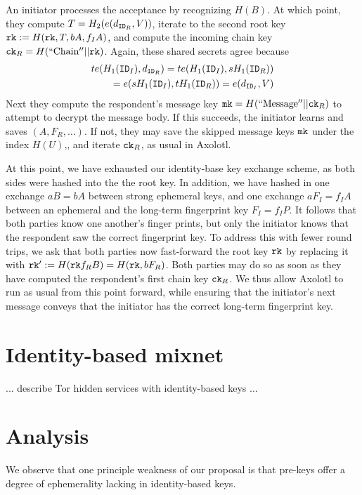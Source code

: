 \documentclass[twoside,letterpaper]{sig-alternate}
\def\mathperiod{.}
\def\mathperiod{}
\begin{document}
An initiator processes the acceptance by recognizing $H(B)$.
At which point, they compute $T = H_2( e(d_{\mathtt{ID}_R}, V) )$,
iterate to the second root key $\mathtt{rk} := H(\mathtt{rk}, T, b A, f_I A )$, and 
compute the incoming chain key $\mathtt{ck}_R = H(\mathrm{``Chain''} || \mathtt{rk})$.
Again, these shared secrets agree because 
\begin{align*}
t e(H_1(\ID_I), d_{\ID_R}) = t e(H_1(\ID_I), s H_1(\ID_R)) \\
 \quad = e(s H_1(\ID_I), t H_1(\ID_R)) = e(d_{\ID_I}, V) \mathperiod
\end{align*}
Next they compute the respondent's
 message key $\mathtt{mk} = H(\mathrm{``Message''}  || \mathtt{ck}_R)$ 
to attempt to decrypt the message body.
If this succeeds, the initiator learns and saves $(A,F_R,\ldots)$.
If not, they may save the skipped message keys $\mathtt{mk}$ under the index $H(U)$,,
and iterate $\mathtt{ck}_R$, as usual in Axolotl.

At this point, we have exhausted our identity-base key exchange scheme,
 as both sides were hashed into the the root key.  In addition, we have
hashed in one exchange $a B = b A$ between strong ephemeral keys, and
one exchange $a F_I = f_I A$ between an ephemeral and
 the long-term fingerprint key $F_I = f_I P$.
It follows that both parties know one another's finger prints, but only
the initiator knows that the respondent saw the correct fingerprint key.
To address this with fewer round trips, we ask that both parties
now fast-forward the root key $\mathtt{rk}$ by replacing it with
 $\mathtt{rk}' := H(\mathtt{rk} f_R B) = H(\mathtt{rk}, b F_R )$.
Both parties may do so as soon as they have computed the respondent's
 first chain key $\mathtt{ck}_R$.
We thus allow Axolotl to run as usual from this point forward, while
ensuring that the initiator's next message conveys that the initiator
 has the correct long-term fingerprint key.


\section{Identity-based mixnet} %

... describe Tor hidden services with identity-based keys ...


\section{Analysis}

We observe that one principle weakness of our proposal is that pre-keys
offer a degree of ephemerality lacking in identity-based keys.
\end{document}
